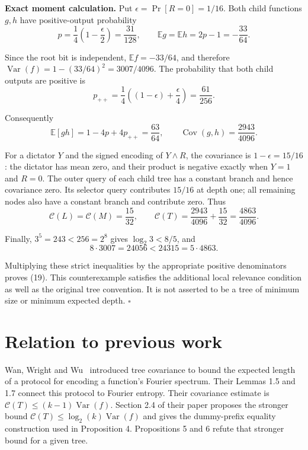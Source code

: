 \documentclass[
  american,
  11pt,
]{article}
\begin{document}
\textbf{Exact moment calculation.} Put \(\epsilon=\Pr[R=0]=1/16\). Both
child functions \(g,h\) have positive-output probability \[
p=\frac14\left(1-\frac\epsilon2\right)=\frac{31}{128},
\qquad \mathbb E g=\mathbb E h=2p-1=-\frac{33}{64}.
\]

Since the root bit is independent, \(\mathbb E f=-33/64\), and therefore
\(\operatorname{Var}(f)=1-(33/64)^2=3007/4096\). The probability that
both child outputs are positive is \[
p_{++}=\frac14\left((1-\epsilon)+\frac\epsilon4\right)=\frac{61}{256}.
\]

Consequently \[
\mathbb E[gh]=1-4p+4p_{++}=\frac{63}{64},\qquad
\operatorname{Cov}(g,h)=\frac{2943}{4096}.
\]

For a dictator \(Y\) and the signed encoding of \(Y\land R\), the
covariance is \(1-\epsilon=15/16\): the dictator has mean zero, and
their product is negative exactly when \(Y=1\) and \(R=0\). The outer
query of each child tree has a constant branch and hence covariance
zero. Its selector query contributes \(15/16\) at depth one; all
remaining nodes also have a constant branch and contribute zero. Thus \[
\mathcal C(L)=\mathcal C(M)=\frac{15}{32},\qquad
\mathcal C(T)=\frac{2943}{4096}+\frac{15}{32}=\frac{4863}{4096}.
\]

Finally, \(3^5=243<256=2^8\) gives \(\log_2 3<8/5\), and \[
8\cdot3007=24056<24315=5\cdot4863.
\]

Multiplying these strict inequalities by the appropriate positive
denominators proves (19). This counterexample satisfies the additional
local relevance condition as well as the original tree convention. It is
not asserted to be a tree of minimum size or minimum expected depth.
\(\square\)

\section{Relation to previous work}\label{relation-to-previous-work}

Wan, Wright and Wu~\cite{WWW} introduced tree covariance to bound the expected
length of a protocol for encoding a function's Fourier spectrum. Their
Lemmas 1.5 and 1.7 connect this protocol to Fourier entropy. Their
covariance estimate is \(\mathcal C(T)\leq(k-1)\operatorname{Var}(f)\).
Section 2.4 of their paper proposes the stronger bound
\(\mathcal C(T)\leq\log_2(k)\operatorname{Var}(f)\) and gives the
dummy-prefix equality construction used in Proposition 4. Propositions 5
and 6 refute that stronger bound for a given tree.
\end{document}
